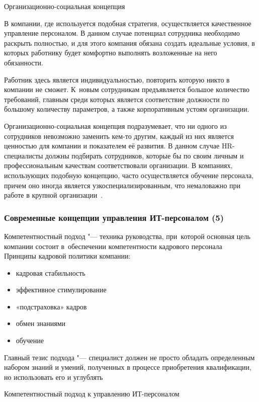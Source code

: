\documentclass{../industrial-development}
\begin{document}
\lecturenotes

\alert{Организационно-социальная концепция}

В компании, где используется подобная стратегия, осуществляется качественное управление персоналом. В данном случае потенциал сотрудника необходимо раскрыть полностью, и для этого компания обязана создать идеальные условия, в которых работнику будет комфортно выполнять возложенные на него обязанности.

Работник здесь является индивидуальностью, повторить которую никто в компании не сможет. К~новым сотрудникам предъявляется большое количество требований, главным среди которых является соответствие должности по большому количеству параметров, а также корпоративным устоям организации. 

Организационно-социальная концепция подразумевает, что ни одного из сотрудников невозможно заменить кем-то другим, каждый из них является ценностью для компании и показателем её развития. В данном случае HR-специалисты должны подбирать сотрудников, которые бы по своим личным и профессиональным качествам соответствовали организации. В компаниях, использующих подобную концепцию, часто осуществляется обучение персонала, причем оно иногда является узкоспециализированным, что немаловажно при работе в крупной организации~\cite{Sovrconcept}. 

\begin{frame} \frametitle{Современные концепции управления ИТ-персоналом (5)}
	\alert{Компетентностный подход} "---  техника руководства, при~которой основная цель компании состоит в~обеспечении компетентности кадрового персонала 
	\\Принципы кадровой политики компании: 
	\begin{itemize}
		\item кадровая стабильность
		\item эффективное стимулирование
		\item «подстраховка» кадров
		\item обмен знаниями
		\item обучение
	\end{itemize}
	Главный тезис подхода "--- специалист должен не просто обладать определенным набором знаний и умений, полученных в процессе приобретения квалификации, но использовать его и углублять 
\end{frame}

\lecturenotes

\alert{Компетентностный подход к управлению ИТ-персоналом}
\end{document}
